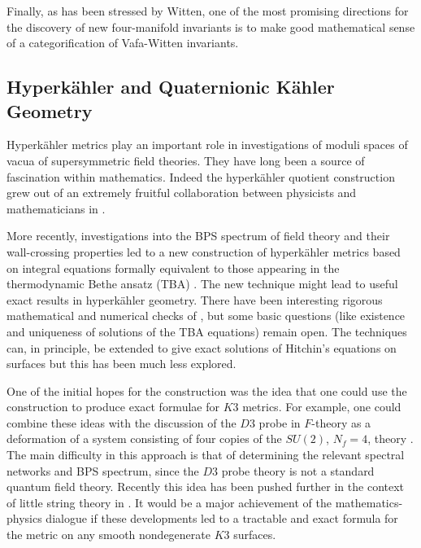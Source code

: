 \documentclass[12pt]{article}
\begin{document}
 
Finally, as has been stressed by Witten, one of the most promising directions
for the discovery of new four-manifold invariants is to make good mathematical
sense of a categorification of Vafa-Witten invariants.


\subsection{Hyperk{\"a}hler and Quaternionic K{\"a}hler Geometry}


Hyperk{\"a}hler metrics play an important role in investigations of
moduli spaces of vacua of supersymmetric field theories. They
have long been a source of fascination within mathematics.
Indeed the hyperk{\"a}hler quotient construction grew out of an
extremely fruitful collaboration between physicists and mathematicians in \cite{Hitchin:1986ea}.

More recently, investigations into the BPS spectrum of field theory and their
wall-crossing properties led to a new construction of hyperk{\"a}hler metrics
based on integral equations formally equivalent to those appearing in the
thermodynamic Bethe ansatz (TBA) \cite{Gaiotto:2010okc}.  The new technique
might lead to useful exact results in hyperk{\"a}hler geometry.
There have been interesting rigorous mathematical \cite{Fredrickson:2018vok} and numerical \cite{Dumas:2018qpt,Dumas:2020zoz}
checks of  \cite{Gaiotto:2010okc}, but some basic questions (like existence and
uniqueness of solutions of the TBA equations) remain open.
The techniques can, in principle, be extended to give exact solutions of
Hitchin's equations on surfaces  \cite{Gaiotto:2011tf} but this
has been much less explored.




One of the initial hopes for the construction \cite{Gaiotto:2010okc}
was the idea that one could use
the construction to produce exact formulae for $K3$ metrics. For example,
one could combine these ideas with the discussion of the
$D3$ probe in $F$-theory as a deformation of a system consisting of
four copies of the $SU(2)$, $N_{f}=4$, theory \cite{Banks:1996nj}. The
main difficulty in this approach is that of determining the relevant
spectral networks and BPS spectrum, since the $D3$ probe theory is not a standard quantum
field theory. Recently this idea has been pushed further in the context of
little string theory in  \cite{Kachru:2020tat,Tripathy:2020mjj}. It would
be a major achievement of the mathematics-physics dialogue
 if these developments led to a tractable and exact formula
for the metric on any smooth nondegenerate $K3$ surfaces.
\end{document}
